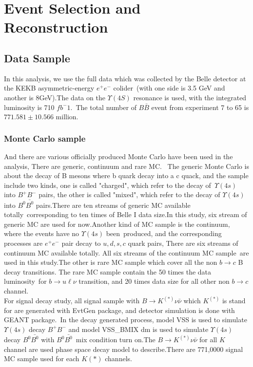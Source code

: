 \chapter{Event Selection and Reconstruction}
\section{Data Sample}
In this analysis, we use the full data which was collected by the Belle detector at the KEKB asymmetric-energy $e^+e^-$ colider\
(with one side is 3.5 GeV and another is 8GeV).The data on the $\Upsilon(4S)$ resonance is used, with the integrated luminosity is 710 $fb^-1$.\
The total number of $B\bar{B}$ event from experiment 7 to 65 is $771.581\pm10.566$ million. 
\subsection{Monte Carlo sample}
And there are various officially produced Monte Carlo have been used in the analysis, There are generic, continuum and rare MC. \
The generic Monte Carlo is about the decay of B mesons where b quark decay into a c quack, and the sample include two kinds, one is called "charged", which refer to the decay of\
 $\Upsilon(4s)$ into $B^+ B^-$ pairs, the other is called "mixed", which refer to the decay of $\Upsilon(4s)$ into $B^0 \bar{B^0}$ pairs.There are ten streams of generic MC available totally\
corresponding to ten times of Belle I data size.In this study, six stream of generic MC are used for now.Another kind of MC sample is the continuum, where the events have no $\Upsilon(4s)$ been\
produced, and the corresponding processes are $e^+ e^-$ pair decay to $u, d, s, c$ quark pairs, There are six streams of continuum MC available totally. All six streams of the continuum MC sample\
are used in this study.The other is rare MC sample which cover all the non $b \rightarrow c$ B decay transitions. The rare MC sample contain the 50 times the data luminosity\
for $b \rightarrow u \ell \nu$ transition, and 20 times data size for all other non $b \rightarrow c$ channel.\\
For signal decay study, all signal sample with $B \rightarrow K^{(*)} \nu \bar{\nu}$ which $K^{(*)}$ is stand for are generated with EvtGen package, and detector simulation is done with GEANT package.\
In the decay generated process, model VSS is used to simulate $\Upsilon(4s)$ decay $B^+ B^-$ and model VSS\_BMIX dm is used to simulate $\Upsilon(4s)$ decay $B^0 \bar{B^0}$ with $B^0 \bar{B^0}$\
mix condition turn on.The $B \rightarrow K^{(*)} \nu \bar{\nu}$ for all $K$ channel are used phase space decay model to describe.There are 771,0000 signal MC sample used for each $K{(*)}$ channels.\
